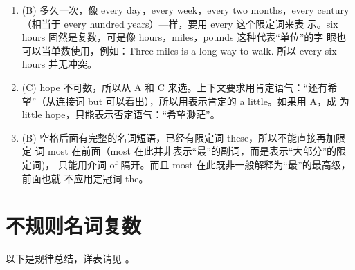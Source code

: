 \begin{enumerate}
\item (B) 多久一次，像 every day，every week，every two months，every
  century（相当于 every hundred years）—样，要用 every 这个限定词来表
  示。six hours 固然是复数，可是像 hours，miles，pounds 这种代表“单位”的字
  眼也可以当单数使用，例如：Three miles is a long way to walk. 所以 every
  six hours 并无冲突。

\item (C) hope 不可数，所以从 A 和 C 来选。上下文要求用肯定语气：“还有希
  望”（从连接词 but 可以看出），所以用表示肯定的 a little。如果用 A，成
  为 little hope，只能表示否定语气：“希望渺茫”。


\item (B) 空格后面有完整的名词短语，已经有限定词 these，所以不能直接再加限定
  词 most 在前面（most 在此并非表示“最”的副词，而是表示“大部分”的限定词)，
  只能用介词 of 隔开。而且 most 在此既非一般解释为“最”的最高级，前面也就
  不应用定冠词 the。

\end{enumerate}

\section{不规则名词复数}

以下是规律总结，详表请见 。

